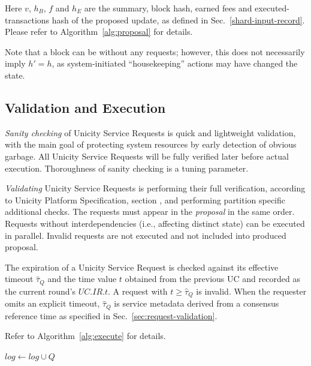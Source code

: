 Here $v$, $h_B$, $f$ and $h_E$ are the summary, block hash, earned fees and executed-transactions hash of the proposed update, as defined in Sec.~\ref{shard-input-record}. Please refer to Algorithm~\ref{alg:proposal} for details.

Note that a block can be without any requests; however, this does not necessarily imply $h' = h$, as system-initiated ``housekeeping'' actions may have changed the state.

\subsection{Validation and Execution}\label{validation-state-update}

\emph{Sanity checking} of Unicity Service Requests is quick and lightweight validation, with the main goal of protecting system resources by early detection of obvious garbage. All Unicity Service Requests will be fully verified later before actual execution. Thoroughness of sanity checking is a tuning parameter.

\emph{Validating} Unicity Service Requests is performing their full verification, according to Unicity Platform Specification, section , and performing partition specific additional checks. The requests must appear in the \emph{proposal} in the same order. Requests without interdependencies (i.e., affecting distinct state) can be executed in parallel. Invalid requests are not executed and not included into produced proposal.

The expiration of a Unicity Service Request is checked against its effective timeout $\widehat\tau_Q$ and the time value $t$ obtained from the previous UC and recorded as the current round's $UC.IR.t$. A request with $t \ge \widehat\tau_Q$ is invalid. When the requester omits an explicit timeout, $\widehat\tau_Q$ is service metadata derived from a consensus reference time as specified in Sec.~\ref{sec:request-validation}.

Refer to Algorithm~\ref{alg:execute} for details.

\begin{algorithm}[tb]
  \caption{Validate and Execute Unicity Service Requests}\label{alg:execute}
  \begin{algorithmic}[0]
      
      \State {}  
    \EndFunction
    \State
      \State {}
    \EndFunction
    \State
       
          \State {}   
          \State $log \gets log \cup Q$
        \EndIf
      \EndFor
    \EndFunction
  \end{algorithmic}
\end{algorithm}


